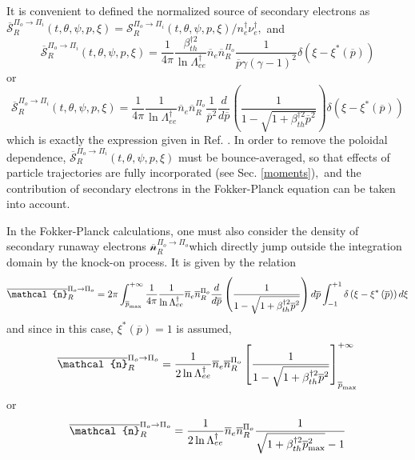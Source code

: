 It is convenient to defined the normalized source of secondary electrons as $%
\overline{\mathcal{S}}_{R}^{\Pi _{o}\rightarrow \Pi _{i}}\left( t,\theta
,\psi ,p,\xi \right) =\mathcal{S}_{R}^{\Pi _{o}\rightarrow \Pi _{i}}\left(
t,\theta ,\psi ,p,\xi \right) /n_{e}^{\dag }\nu _{e}^{\dag },$ and 
\begin{equation}
\overline{\mathcal{S}}_{R}^{\Pi _{o}\rightarrow \Pi _{i}}\left( t,\theta
,\psi ,p,\xi \right) =\frac{1}{4\pi }\frac{\beta _{th}^{\dag 2}}{\ln \Lambda
_{ee}^{\dag }}\overline{n}_{e}\overline{n}_{R}^{\Pi _{o}}\frac{1}{\overline{p%
}\gamma \left( \gamma -1\right) ^{2}}\delta \left( \xi -\xi ^{\ast }\left( 
\overline{p}\right) \right) 
\end{equation}%
or 
\begin{equation}
\overline{\mathcal{S}}_{R}^{\Pi _{o}\rightarrow \Pi _{i}}\left( t,\theta
,\psi ,p,\xi \right) =\frac{1}{4\pi }\frac{1}{\ln \Lambda _{ee}^{\dag }}%
\overline{n}_{e}\overline{n}_{R}^{\Pi _{o}}\frac{1}{\overline{p}^{2}}\frac{d%
}{d\overline{p}}\left( \frac{1}{1-\sqrt{1+\beta _{th}^{\dag 2}\overline{p}%
^{2}}}\right) \delta \left( \xi -\xi ^{\ast }\left( \overline{p}\right)
\right) 
\end{equation}%
which is exactly the expression given in Ref. \cite{ros97}. In order to
remove the poloidal dependence, $\overline{\mathcal{S}}_{R}^{\Pi
_{o}\rightarrow \Pi _{i}}\left( t,\theta ,\psi ,p,\xi \right) $ must be
bounce-averaged, so that effects of particle trajectories are fully
incorporated (see Sec. \ref{moments})$,$ and the contribution of secondary
electrons in the Fokker-Planck equation can be taken into account.

In the Fokker-Planck calculations, one must also consider the density of
secondary runaway electrons $\overline{\mathcal{n}}_{R}^{\Pi _{o}\rightarrow
\Pi _{o}}$which directly jump outside the integration domain by the knock-on
process. It is given by the relation%
\begin{equation}
\overline{\mathcal{n}}_{R}^{\Pi _{o}\rightarrow \Pi _{o}}=2\pi \int_{%
\overline{p}_{\max }}^{+\infty }\frac{1}{4\pi }\frac{1}{\ln \Lambda
_{ee}^{\dag }}\overline{n}_{e}\overline{n}_{R}^{\Pi _{o}}\frac{d}{d\overline{%
p}}\left( \frac{1}{1-\sqrt{1+\beta _{th}^{\dag 2}\overline{p}^{2}}}\right) d%
\overline{p}\int_{-1}^{+1}\delta \left( \xi -\xi ^{\ast }\left( \overline{p}%
\right) \right) d\xi 
\end{equation}%
and since in this case, $\xi ^{\ast }\left( \overline{p}\right) =1$ is
assumed, 
\begin{equation}
\overline{\mathcal{n}}_{R}^{\Pi _{o}\rightarrow \Pi _{o}}=\frac{1}{2\ln
\Lambda _{ee}^{\dag }}\overline{n}_{e}\overline{n}_{R}^{\Pi _{o}}\left[ 
\frac{1}{1-\sqrt{1+\beta _{th}^{\dag 2}\overline{p}^{2}}}\right] _{\overline{%
p}_{\max }}^{+\infty }
\end{equation}%
or%
\begin{equation}
\overline{\mathcal{n}}_{R}^{\Pi _{o}\rightarrow \Pi _{o}}=\frac{1}{2\ln
\Lambda _{ee}^{\dag }}\overline{n}_{e}\overline{n}_{R}^{\Pi _{o}}\frac{1}{%
\sqrt{1+\beta _{th}^{\dag 2}\overline{p}_{\max }^{2}}-1}
\end{equation}

